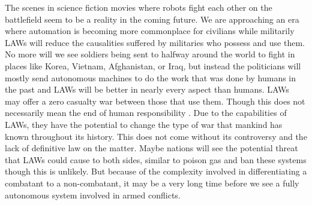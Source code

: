 \documentclass[journal]{IEEEtran}
\begin{document}
The scenes in science fiction movies where robots fight each other on the battlefield seem to be a reality in the coming future. We are approaching an era where automation is becoming more commonplace for civilians while militarily LAWs will reduce the causalities suffered by militaries who possess and use them. No more will we see soldiers being sent to halfway around the world to fight in places like Korea, Vietnam, Afghanistan, or Iraq, but instead the politicians will mostly send autonomous machines to do the work that was done by humans in the past and LAWs will be better in nearly every aspect than humans. LAWs may offer a zero casualty war between those that use them. Though this does not necessarily mean the end of human responsibility \cite{guetlein2005lethal}. Due to the capabilities of LAWs, they have the potential to change the type of war that mankind has known throughout its history. This does not come without its controversy and the lack of definitive law on the matter. Maybe nations will see the potential threat that LAWs could cause to both sides, similar to poison gas and ban these systems though this is unlikely. But because of the complexity involved in differentiating a combatant to a non-combatant, it may be a very long time before we see a fully autonomous system involved in armed conflicts.

\printbibliography
\end{document}
